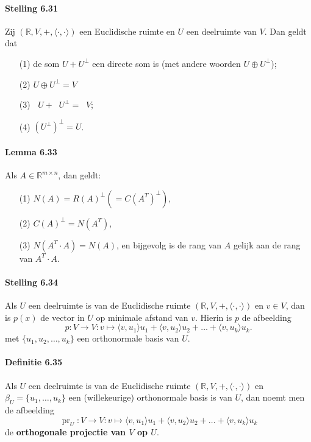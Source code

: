 \documentclass[11pt,oneside,a4paper]{article}
\DeclareMathOperator{\rdim}{dim_\mathbb{R}}
\DeclareMathOperator{\pr}{pr}
\begin{document}
	\paragraph{Stelling 6.31}
		Zij $(\mathbb{R},V,+, \langle \cdot , \cdot \rangle)$ een Euclidische ruimte en $U$ een deelruimte van $V$. Dan geldt dat 
		\begin{itemize}
			\item[(1)] de som $U + U^\perp$ een directe som is (met andere woorden $U \oplus U^\perp$);
			\item[(2)] $U \oplus U^\perp = V$
			\item[(3)] $\rdim U + \rdim U^\perp = \rdim V$;
			\item[(4)] $(U^\perp)^\perp = U$.
		\end{itemize}
	\paragraph{Lemma 6.33}
		Als $A \in \mathbb{R}^{m \times n}$, dan geldt:
		\begin{itemize}
			\item[(1)] $N(A) = R(A)^\perp (= C(A^T)^\perp)$,
			\item[(2)] $C(A)^\perp = N(A^T)$,
			\item[(3)] $N(A^T \cdot A) = N(A)$, en bijgevolg is de rang van $A$ gelijk aan de rang van $A^T \cdot A$.
		\end{itemize}
	\paragraph{Stelling 6.34}
		Als $U$ een deelruimte is van de Euclidische ruimte $(\mathbb{R},V,+, \langle \cdot , \cdot \rangle)$ en $v \in V$, dan is $p(x)$ de vector in $U$ op minimale afstand van $v$. Hierin is $p$ de afbeelding $$p: V \to V: v \mapsto \langle v , u_1 \rangle u_1 + \langle v , u_2 \rangle u_2 + \ldots + \langle v , u_k \rangle u_k.$$ met $\{u_1, u_2, \ldots , u_k\}$ een orthonormale basis van $U$.
	\paragraph{Definitie 6.35}
		Als $U$ een deelruimte is van de Euclidische ruimte $(\mathbb{R},V,+, \langle \cdot , \cdot \rangle)$ en $\beta_U = \{u_1, \ldots , u_k\}$ een (willekeurige) orthonormale basis is van $U$, dan noemt men de afbeelding  
		$$\pr_U: V \to V: v \mapsto \langle v , u_1 \rangle u_1 + \langle v , u_2 \rangle u_2 + \ldots + \langle v , u_k \rangle u_k$$ de \textbf{orthogonale projectie van $V$ op $U$}.
\end{document}
